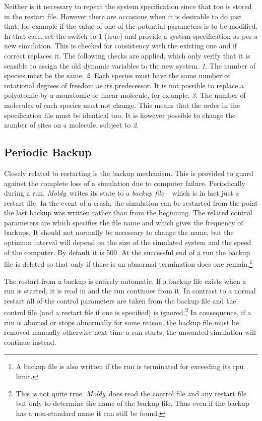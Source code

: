 \documentclass[a4paper,twoside]{report}
\newcommand{\moldy}{\emph{Moldy}}
\begin{document}
Neither is it necessary to repeat the system specification since that
too is stored in the restart file.  However there are occasions
when it is desirable to do just that, for example if the value of one
of the potential parameters is to be modified.  In that case, set the
switch  to 1 (true) and provide a system
specification as per a new simulation.  This is checked for
consistency with the existing one and if correct replaces it.  The
following checks are applied, which only verify that it is sensible to
assign the old dynamic variables to the new system. \emph{1}. The
number of species must be the same. \emph{2}. Each species must have
the same number of rotational degrees of freedom as its predecessor.
It is not possible to replace a polyatomic by a monatomic or
linear molecule, for example.  \emph{3}. The number of molecules of
each species must not change.  This means that the order in the
specification file must be identical too.  It is however possible to
change the number of sites on a molecule, subject to \emph{2}.

\subsection{Periodic Backup}
\label{sec:backup}
Closely related to restarting is the backup mechanism.  This is
provided to guard against the complete loss of a simulation due to
computer failure. Periodically during a run, \moldy\ writes its state
to a \emph{backup file} -- which is in fact just a restart file.  In
the event of a crash, the simulation can be restarted from the point
the last backup was written rather than from the beginning. The
related control parameters are  which specifies the
file name and  which gives the frequency of
backups.  It should not normally be necessary to change the name, but
the optimum interval will depend on the size of the simulated system
and the speed of the computer. By default it is 500.  At the
successful end of a run the backup file is deleted so that only if
there is an abnormal termination does one remain.\footnote{A backup
  file is also written if the run is terminated for exceeding its cpu
  limit.}

The restart from a backup is entirely automatic. If a backup file
exists when a run is started, it is read in and the run continues from
it.  In contrast to a normal restart all of the control parameters are
taken from the backup file and the control file (and a restart file if
one is specified) is ignored.\footnote{This is not quite true. \moldy\ 
  does read the control file and any restart file but only to
  determine the name of the backup file. Thus even if the backup has a
  non-standard name it can still be found.} In consequence, if a run
is aborted or stops abnormally for some reason, the backup file must
be removed manually otherwise next time a run starts, the unwanted
simulation will continue instead.
\end{document}
